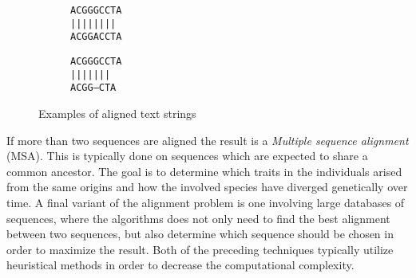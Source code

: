 \documentclass[thesis.tex]{subfiles}
\begin{document}
\par\noindent
\setlength{\intextsep}{0mm}
\begin{wrapfigure}[15]{l}{0.3\textwidth}
  \begin{mdframed}
    \begin{subfigure}[t]{\textwidth}
      \begin{mdframed}
        \begin{center}
          \texttt{ACGGGCCTA}\\
          \texttt{||||\space||||}\\
          \texttt{ACGGACCTA}
        \end{center}
      \end{mdframed}
      \captionsetup{skip=-8pt}
    \end{subfigure}
    \begin{subfigure}[b]{\textwidth}
      \begin{mdframed}
        \begin{center}
          \texttt{ACGGGCCTA}\\
          \texttt{||||\space\space|||}\\
          \texttt{ACGG---CTA}
        \end{center}
      \end{mdframed}
      \captionsetup{skip=-8pt}
    \end{subfigure}
  \end{mdframed}
  \vspace*{-5mm}
  \caption{Examples of aligned text strings}
  \label{fig:alignments}
\end{wrapfigure}
If more than two sequences are aligned the result is a \textit{Multiple sequence alignment} (MSA). This is typically done on sequences which are expected to share a common ancestor. The goal is to determine which traits in the individuals arised from the same origins and how the involved species have diverged genetically over time. A final variant of the alignment problem is one involving large databases of sequences, where the algorithms does not only need to find the best alignment between two sequences, but also determine which sequence should be chosen in order to maximize the result. Both of the preceding techniques typically utilize heuristical methods in order to decrease the computational complexity.
\clearpage
\end{document}
